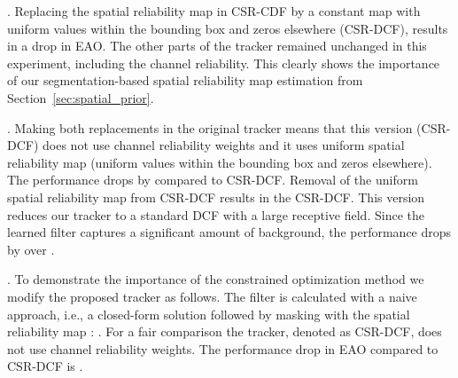 \documentclass[twocolumn]{article}
\begin{document}
.
Replacing the spatial reliability map in CSR-CDF by a constant map with uniform values within the bounding box and zeros elsewhere (CSR-DCF), results in a  drop in EAO. The other parts of the tracker remained unchanged in this experiment, including the channel reliability. This clearly shows the importance of our segmentation-based spatial reliability map estimation from Section~\ref{sec:spatial_prior}.

.
Making both replacements in the original tracker means that this version (CSR-DCF) does not use channel reliability weights and it uses uniform spatial reliability map (uniform values within the bounding box and zeros elsewhere). The performance drops by  compared to CSR-DCF. Removal of the uniform spatial reliability map from CSR-DCF results in the CSR-DCF. This version reduces our tracker to a standard DCF with a large receptive field. Since the learned filter captures a significant amount of background, the  performance drops by over .

.
To demonstrate the importance of the constrained optimization method we modify the proposed tracker as follows. The filter  is calculated with a naive approach, i.e., a closed-form solution followed by masking with the spatial reliability map : . For a fair comparison the tracker, denoted as CSR-DCF, does not use channel reliability weights. The performance drop in EAO compared to CSR-DCF is .
\end{document}
